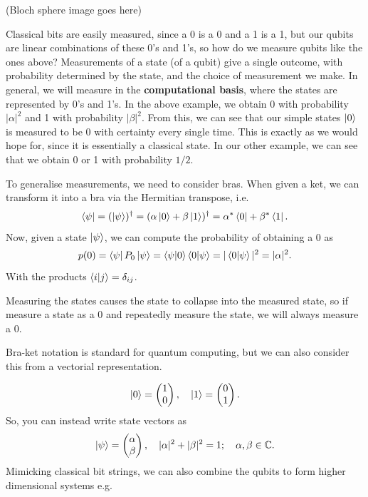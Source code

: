 \documentclass{article}
\theoremstyle{definition}
\begin{document}
(Bloch sphere image goes here)

Classical bits are easily measured, since a 0 is a 0 and a 1 is a 1, but our qubits are linear combinations of these 0's and 1's, so how do we measure qubits like the ones above? Measurements of a state (of a qubit) give a single outcome, with probability determined by the state, and the choice of measurement we make. In general, we will measure in the \textbf{computational basis}, where the states are represented by 0's and 1's. In the above example, we obtain 0 with probability $|\alpha|^2$ and 1 with probability $| \beta|^2$. From this, we can see that our simple states $\ket{0}$  is measured to be 0 with certainty every single time. This is exactly as we would hope for, since it is essentially a classical state. In our other example, we can see that we obtain 0 or 1 with probability $1/2$. 

To generalise measurements, we need to consider bras. When given a ket, we can transform it into a bra via the Hermitian transpose, i.e.
\[
\bra{\psi} = (\ket{\psi})^\dagger = (\alpha \ket{0} + \beta \ket{1})^\dagger = \alpha^\ast \bra{0} + \beta^\ast \bra{1}.
\]
Now, given a state $\ket{\psi}$, we can compute the probability of obtaining a 0 as
\[
p(0) = \bra{\psi} P_0 \ket{\psi} = \braket{\psi | 0} \braket{0 | \psi} = |\braket{0 | \psi}|^2 = | \alpha | ^2.
\]
With the products $\braket{i | j} = \delta_{ij}$.

Measuring the states causes the state to collapse into the measured state, so if measure a state as a 0 and repeatedly measure the state, we will always measure a 0.

Bra-ket notation is standard for quantum computing, but we can also consider this from a vectorial representation.

\[
\ket{0} = \begin{pmatrix} 1 \\ 0\end{pmatrix}, \quad \ket{1} = \begin{pmatrix} 0 \\ 1 \end{pmatrix}.
\]
So, you can instead write state vectors as 
\[
\ket{\psi} = \begin{pmatrix} \alpha \\ \beta \end{pmatrix}, \quad |\alpha |^2 + | \beta|^2 = 1 ; \quad \alpha, \beta \in \mathbb{C}.
\]
Mimicking classical bit strings, we can also combine the qubits to form higher dimensional systems e.g.
\end{document}
